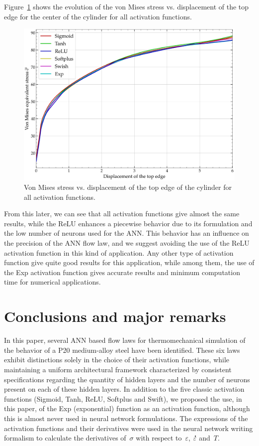 \documentclass[algorithms,article,submit,pdftex,oneauthors]{Definitions/mdpi}
\DeclareRobustCommand{\mdot}[1]{\accentset{\mbox{\bfseries .}}{#1}}
\begin{document}
\textcolor{greencolor}{Figure~\ref{fig:Num-misesTH} shows the evolution of the von Mises stress vs. displacement of the top edge for the center of the cylinder for all activation functions.}
\begin{figure}[h!]
\centering
\includegraphics[width=0.7\columnwidth]{Figures/vonMises}
\caption{Von Mises stress vs. displacement of the top edge of the cylinder for all activation functions.}
\label{fig:Num-misesTH}
\end{figure}
From this later, we can see that all activation functions give almost the same results, while the ReLU enhances a piecewise behavior due to its formulation and the low number of neurons used for the ANN.
This behavior has an influence on the precision of the ANN flow law, and we suggest avoiding the use of the ReLU activation function in this kind of application.
Any other type of activation function give quite good results for this application, while among them, the use of the Exp activation function gives accurate results and minimum computation time for numerical applications.

\section{Conclusions and major remarks}\label{sec:Conclusions}

\textcolor{greencolor}{In this paper, several ANN based flow laws for thermomechanical simulation of the behavior of a P20 medium-alloy steel have been identified.
These six laws exhibit distinctions solely in the choice of their activation functions, while maintaining a uniform architectural framework characterized by consistent specifications regarding the quantity of hidden layers and the number of neurons present on each of these hidden layers.}
In addition to the five classic activation functions (Sigmoid, Tanh, ReLU, Softplus and Swift), we proposed the use, in this paper, of the Exp (exponential) function as an activation function, although this is almost never used in neural network formulations.
\textcolor{greencolor}{The expressions of the activation functions and their derivatives were used in the neural network writing formalism to calculate the derivatives of~$\sigma$ with respect to~$\varepsilon$, $\mdot{\varepsilon}$ and~$T$.}
\end{document}
